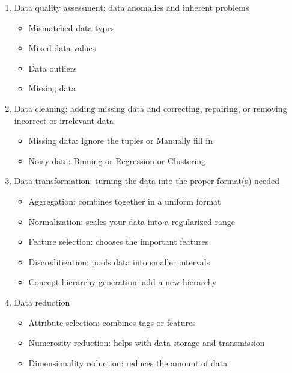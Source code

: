 \documentclass[12pt]{article}  %
\begin{document}
\begin{itemize}
 \begin{enumerate}[(1)]
         \setlength{\parsep}{0ex} %
     \setlength{\topsep}{2ex} %
     \setlength{\itemsep}{1ex} %
     \item Data quality assessment: data anomalies and inherent problems
     \begin{itemize}
         \setlength{\parsep}{0ex} %
         \setlength{\topsep}{2ex} %
         \setlength{\itemsep}{1ex} %
         \item Mismatched data types
         \item Mixed data values
         \item Data outliers
         \item Missing data
     \end{itemize}
     \item Data cleaning: adding missing data and correcting, repairing, or removing incorrect or irrelevant data
     \begin{itemize}
     \setlength{\parsep}{0ex} %
     \setlength{\topsep}{2ex} %
     \setlength{\itemsep}{1ex} %
     \item Missing data: Ignore the tuples or Manually fill in 
     \item Noisy data: Binning or Regression or Clustering 
 \end{itemize}
     \item Data transformation: turning the data into the proper format(s) needed
     \begin{itemize}
         \setlength{\parsep}{0ex} %
         \setlength{\topsep}{2ex} %
         \setlength{\itemsep}{1ex} %
         \item Aggregation: combines together in a uniform format
         \item Normalization: scales your data into a regularized range
         \item Feature selection: chooses the important features
         \item Discreditization: pools data into smaller intervals
         \item Concept hierarchy generation: add a new hierarchy
     \end{itemize}
     \item Data reduction
 \begin{itemize}
     \setlength{\parsep}{0ex} %
     \setlength{\topsep}{2ex} %
     \setlength{\itemsep}{1ex} %
     \item Attribute selection: combines tags or features
     \item Numerosity reduction: helps with data storage and transmission
     \item Dimensionality reduction: reduces the amount of data 
 \end{itemize}
 \end{enumerate}
 
 
 
 
 
 
 \end{itemize}
 
\end{document}
